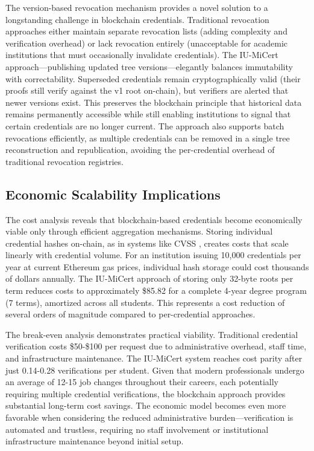The version-based revocation mechanism provides a novel solution to a longstanding challenge in blockchain credentials. Traditional revocation approaches either maintain separate revocation lists (adding complexity and verification overhead) or lack revocation entirely (unacceptable for academic institutions that must occasionally invalidate credentials). The IU-MiCert approach—publishing updated tree versions—elegantly balances immutability with correctability. Superseded credentials remain cryptographically valid (their proofs still verify against the v1 root on-chain), but verifiers are alerted that newer versions exist. This preserves the blockchain principle that historical data remains permanently accessible while still enabling institutions to signal that certain credentials are no longer current. The approach also supports batch revocations efficiently, as multiple credentials can be removed in a single tree reconstruction and republication, avoiding the per-credential overhead of traditional revocation registries.

\subsection{Economic Scalability Implications}
\label{subsec:economic-implications}

The cost analysis reveals that blockchain-based credentials become economically viable only through efficient aggregation mechanisms. Storing individual credential hashes on-chain, as in systems like CVSS \cite{nguyen2018cvss}, creates costs that scale linearly with credential volume. For an institution issuing 10,000 credentials per year at current Ethereum gas prices, individual hash storage could cost thousands of dollars annually. The IU-MiCert approach of storing only 32-byte roots per term reduces costs to approximately \$85.82 for a complete 4-year degree program (7 terms), amortized across all students. This represents a cost reduction of several orders of magnitude compared to per-credential approaches.

The break-even analysis demonstrates practical viability. Traditional credential verification costs \$50-\$100 per request due to administrative overhead, staff time, and infrastructure maintenance. The IU-MiCert system reaches cost parity after just 0.14-0.28 verifications per student. Given that modern professionals undergo an average of 12-15 job changes throughout their careers, each potentially requiring multiple credential verifications, the blockchain approach provides substantial long-term cost savings. The economic model becomes even more favorable when considering the reduced administrative burden—verification is automated and trustless, requiring no staff involvement or institutional infrastructure maintenance beyond initial setup.

